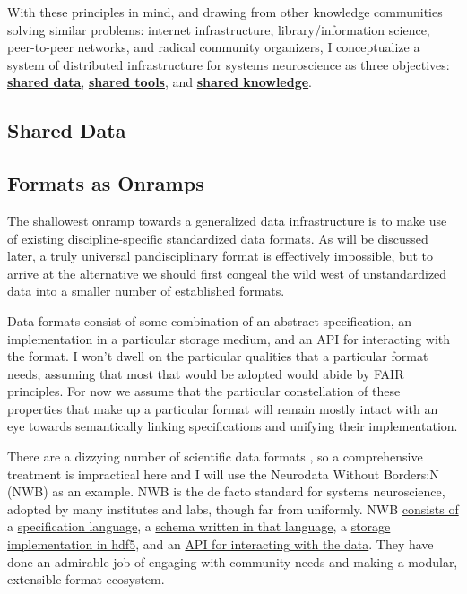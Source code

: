 \documentclass[10pt]{tufte-book}
\begin{document}
With these principles in mind, and drawing from other knowledge
communities solving similar problems: internet infrastructure,
library/information science, peer-to-peer networks, and radical
community organizers, I conceptualize a system of distributed
infrastructure for systems neuroscience as three objectives:
\protect\hyperlink{shared-data}{\textbf{shared data}},
\protect\hyperlink{shared-tools}{\textbf{shared tools}}, and
\protect\hyperlink{shared-knowledge}{\textbf{shared knowledge}}.





\subsection{Shared Data}


\subsection{Formats as Onramps}



 The shallowest onramp towards a generalized data
infrastructure is to make use of existing discipline-specific
standardized data formats. As will be discussed later, a truly universal
pandisciplinary format is effectively impossible, but to arrive at the
alternative we should first congeal the wild west of unstandardized data
into a smaller number of established formats.

Data formats consist of some combination of an abstract specification,
an implementation in a particular storage medium, and an API for
interacting with the format. I won't dwell on the particular qualities
that a particular format needs, assuming that most that would be adopted
would abide by FAIR principles. For now we assume that the particular
constellation of these properties that make up a particular format will
remain mostly intact with an eye towards semantically linking
specifications and unifying their implementation.

There are a dizzying number of scientific data formats \citep{teamScientificDataFormats} , so a comprehensive treatment is
impractical here and I will use the Neurodata Without Borders:N
(NWB)\citep{rubelNWBAccessibleData2019a}  as an example. NWB is
the de facto standard for systems neuroscience, adopted by many
institutes and labs, though far from uniformly. NWB
\href{https://www.nwb.org/nwb-software/}{consists of} a
\href{https://schema-language.readthedocs.io/en/stable/}{specification
language}, a \href{https://nwb-schema.readthedocs.io/en/stable/}{schema
written in that language}, a
\href{https://nwb-storage.readthedocs.io/en/stable/}{storage
implementation in hdf5}, and an
\href{https://pynwb.readthedocs.io/en/stable/}{API for interacting with
the data}. They have done an admirable job of engaging with community
needs \citep{rubelNeurodataBordersEcosystem2021}  and making a
modular, extensible format ecosystem.
\end{document}
